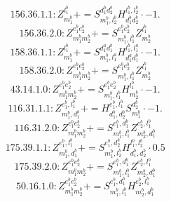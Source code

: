 \documentclass[letterpaper,10pt,fleqn,leqno,onecolumn]{article}
\begin{document}
\begin{equation} \;\;\;\;\;\;  156.36.1.1: Z^{l_{1}^{b}}_{m_{1}^{b}}+=S^{d_{1}^{b}d_{2}^{b}}_{m_{1}^{b},l_{2}^{b}}H^{l_{1}^{b},l_{2}^{b}}_{d_{1}^{b}d_{2}^{b}}\cdot -1. \end{equation}
\begin{equation} \;\;\;\;\;\;  156.36.2.0: Z^{e_{1}^{b}e_{2}^{b}}_{m_{1}^{b}m_{2}^{b}}+=S^{e_{1}^{b}e_{2}^{b}}_{m_{1}^{b},l_{1}^{b}}Z^{l_{1}^{b}}_{m_{2}^{b}} \end{equation}
\begin{equation} \;\;\;\;\;\;  158.36.1.1: Z^{l_{1}^{b}}_{m_{1}^{b}}+=S^{d_{1}^{a}d_{1}^{b}}_{m_{1}^{b},l_{1}^{a}}H^{l_{1}^{b},l_{1}^{a}}_{d_{1}^{a}d_{1}^{b}}\cdot -1. \end{equation}
\begin{equation} \;\;\;\;\;\;  158.36.2.0: Z^{e_{1}^{b}e_{2}^{b}}_{m_{1}^{b}m_{2}^{b}}+=S^{e_{1}^{b}e_{2}^{b}}_{m_{1}^{b},l_{1}^{b}}Z^{l_{1}^{b}}_{m_{2}^{b}} \end{equation}
\begin{equation} \;\;\;\;\;\;  43.14.1.0: Z^{e_{1}^{b}e_{2}^{b}}_{m_{1}^{b}m_{2}^{b}}+=S^{e_{1}^{b}e_{2}^{b}}_{m_{1}^{b},l_{1}^{b}}H^{l_{1}^{b}}_{m_{2}^{b}}\cdot -1. \end{equation}
\begin{equation} \;\;\;\;\;\;  116.31.1.1: Z^{e_{1}^{b},l_{1}^{b}}_{m_{1}^{b},d_{1}^{b}}+=H^{e_{1}^{b},l_{1}^{b}}_{d_{1}^{b},d_{2}^{b}}S^{d_{2}^{b}}_{m_{1}^{b}}\cdot -1. \end{equation}
\begin{equation} \;\;\;\;\;\;  116.31.2.0: Z^{e_{1}^{b}e_{2}^{b}}_{m_{1}^{b}m_{2}^{b}}+=S^{e_{1}^{b},d_{1}^{b}}_{m_{1}^{b},l_{1}^{b}}Z^{e_{2}^{b},l_{1}^{b}}_{m_{2}^{b},d_{1}^{b}} \end{equation}
\begin{equation} \;\;\;\;\;\;  175.39.1.1: Z^{e_{1}^{b},l_{1}^{b}}_{m_{1}^{b},d_{1}^{b}}+=S^{e_{1}^{b},d_{2}^{b}}_{m_{1}^{b},l_{2}^{b}}H^{l_{1}^{b},l_{2}^{b}}_{d_{1}^{b},d_{2}^{b}}\cdot 0.5 \end{equation}
\begin{equation} \;\;\;\;\;\;  175.39.2.0: Z^{e_{1}^{b}e_{2}^{b}}_{m_{1}^{b}m_{2}^{b}}+=S^{e_{1}^{b},d_{1}^{b}}_{m_{1}^{b},l_{1}^{b}}Z^{e_{2}^{b},l_{1}^{b}}_{m_{2}^{b},d_{1}^{b}} \end{equation}
\begin{equation} \;\;\;\;\;\;  50.16.1.0: Z^{e_{1}^{b}e_{2}^{b}}_{m_{1}^{b}m_{2}^{b}}+=S^{e_{1}^{b},d_{1}^{b}}_{m_{1}^{b},l_{1}^{b}}H^{e_{2}^{b},l_{1}^{b}}_{m_{2}^{b},d_{1}^{b}} \end{equation}
\end{document}
